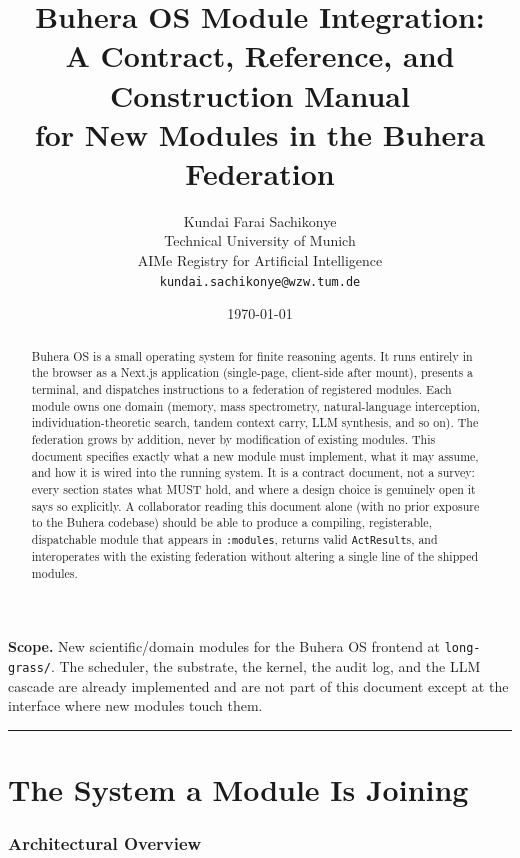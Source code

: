 \documentclass[11pt,a4paper]{article}
\title{\textbf{Buhera OS Module Integration:\\
A Contract, Reference, and Construction Manual\\
for New Modules in the Buhera Federation}}
\author{%
Kundai Farai Sachikonye\\
\small Technical University of Munich\\
\small AIMe Registry for Artificial Intelligence\\
\small \texttt{kundai.sachikonye@wzw.tum.de}}
\date{\today}
\theoremstyle{contract}
\begin{document}
\maketitle

\begin{abstract}
\noindent
Buhera OS is a small operating system for finite reasoning agents. It
runs entirely in the browser as a Next.js application (single-page,
client-side after mount), presents a terminal, and dispatches
instructions to a federation of registered modules. Each module owns
one domain (memory, mass spectrometry, natural-language interception,
individuation-theoretic search, tandem context carry, LLM synthesis,
and so on). The federation grows by addition, never by modification of
existing modules. This document specifies exactly what a new module
must implement, what it may assume, and how it is wired into the running
system. It is a contract document, not a survey: every section states
what MUST hold, and where a design choice is genuinely open it says so
explicitly. A collaborator reading this document alone (with no prior
exposure to the Buhera codebase) should be able to produce a compiling,
registerable, dispatchable module that appears in \texttt{:modules},
returns valid \texttt{ActResult}s, and interoperates with the existing
federation without altering a single line of the shipped modules.
\end{abstract}

\noindent\textbf{Scope.} New scientific/domain modules for the Buhera OS
frontend at \texttt{long-grass/}. The scheduler, the substrate, the
kernel, the audit log, and the LLM cascade are already implemented and
are not part of this document except at the interface where new modules
touch them.

\tableofcontents

\vspace{6pt}\hrule\vspace{6pt}

\part{The System a Module Is Joining}

\section{Architectural Overview}
\label{sec:overview}
\end{document}
